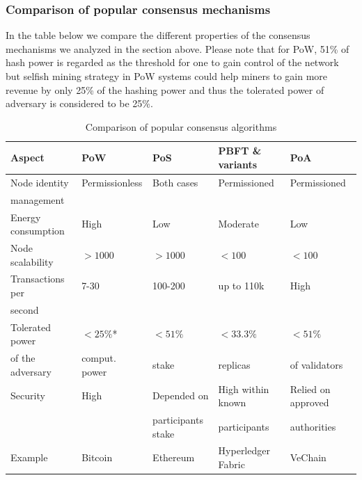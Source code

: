 \subsubsection{Comparison of popular consensus mechanisms}

In the table below we compare the different properties of the consensus mechanisms we analyzed in the section above.
Please note that for PoW, 51\% of hash power is regarded as the threshold for one to gain control of the network
but selfish mining strategy in PoW systems could help miners to gain more revenue by only 25\% of the hashing power and thus
the tolerated power of adversary is considered to be 25\%.
\begin{table}[h!]
    \centering
    \begin{tabular}{l|llll}
        \textbf{Aspect}    & PoW            & PoS                & PBFT \& variants   & PoA                \\
        \hline
        Node identity      & Permissionless & Both cases         & Permissioned       & Permissioned       \\
        management         &                &                    &                    &                    \\[5pt]
        \hline
        Energy consumption & High           & Low                & Moderate           & Low                \\[5pt]
        \hline
        Node scalability   & $> 1000$       & $> 1000$           & $< 100$            & $< 100$            \\[5pt]
        \hline
        Transactions per   & 7-30           & 100-200            & up to 110k         & High               \\
        second             &                &                    &                    &                    \\[5pt]
        \hline
        Tolerated power    & $< 25\%$*      & $< 51\%$           & $< 33.3\%$         & $< 51\%$           \\
        of the adversary   & comput. power  & stake              & replicas           & of validators      \\[5pt]
        \hline
        Security           & High           & Depended on        & High within known  & Relied on approved \\
                           &                & participants stake & participants       & authorities        \\[5pt]
        \hline
        Example            & Bitcoin        & Ethereum           & Hyperledger Fabric & VeChain            \\[5pt]
    \end{tabular}\\
    \caption{Comparison of popular consensus algorithms \cite{blockchainTech}}
\end{table}

